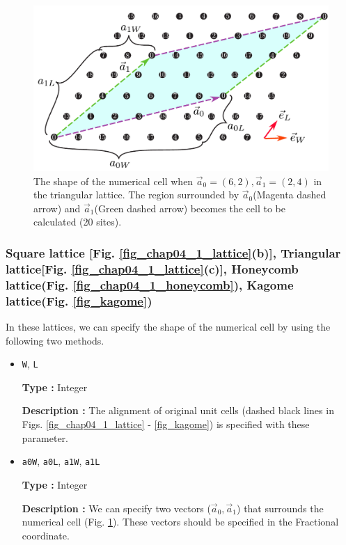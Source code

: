 \begin{figure}[!tbhp]
  \begin{center}
    \includegraphics[width=15cm]{../figs/chap04_1_unitlattice.pdf}
    \caption{The shape of the numerical cell 
      when ${\vec a}_0 = (6, 2), {\vec a}_1 = (2, 4)$
      in the triangular lattice.
      The region surrounded by 
      ${\vec a}_0$(Magenta dashed arrow) and ${\vec a}_1$(Green dashed arrow)
      becomes the cell to be calculated (20 sites).
    }
    \label{fig_chap04_1_unitlattice}
  \end{center}
\end{figure}

\subsubsection{Square lattice [Fig. \ref{fig_chap04_1_lattice}(b)], 
Triangular lattice[Fig. \ref{fig_chap04_1_lattice}(c)],
Honeycomb lattice(Fig. \ref{fig_chap04_1_honeycomb}),
Kagome lattice(Fig. \ref{fig_kagome})}

In these lattices,
we can specify the shape of the numerical cell by using the following two methods.

\begin{itemize}

\item \verb|W|, \verb|L|

{\bf Type :} Integer

{\bf Description :} The alignment of original unit cells 
(dashed black lines in Figs. \ref{fig_chap04_1_lattice} - \ref{fig_kagome})
is specified with these parameter.

\item \verb|a0W|, \verb|a0L|, \verb|a1W|, \verb|a1L|

{\bf Type :} Integer

{\bf Description :} 
We can specify two vectors (${\vec a}_0, {\vec a}_1$)
that surrounds the numerical cell (Fig. \ref{fig_chap04_1_unitlattice}).
These vectors should be specified in the Fractional coordinate.

\end{itemize}


